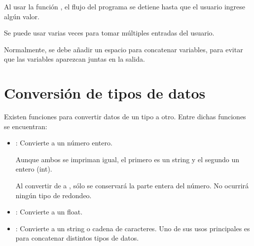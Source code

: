 Al usar la función , el flujo del programa se detiene hasta que el usuario ingrese algún valor.
\medskip

Se puede usar  varias veces para tomar múltiples entradas del usuario.


Normalmente, se debe añadir un espacio para concatenar variables, para evitar que las variables aparezcan juntas en la salida.

\section{Conversión de tipos de datos}

Existen funciones para convertir datos de un tipo a otro.
Entre dichas funciones se encuentran:

\begin{itemize}
  \item {}: Convierte a un número entero.
  

  Aunque ambos se impriman igual, el primero es un string y el segundo un entero (int).


  Al convertir de  a , sólo se conservará la parte entera del número.
No ocurrirá ningún tipo de redondeo.


  \item {}: Convierte a un float.
  

  \item {}: Convierte a un string o cadena de caracteres.
Uno de sus usos principales es para concatenar distintos tipos de datos.


\end{itemize}

